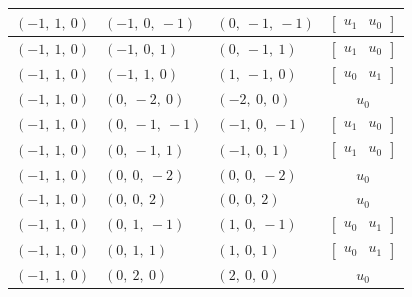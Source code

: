 \documentclass[11pt]{article}
\theoremstyle{definition}
\begin{document}
\begin{longtable}{|l|l|l|c|}
    \hline
    $\left( -1, \  1, \  0\right)$ & $\left( -1, \  0, \  -1\right)$ & $\left( 0, \  -1, \  -1\right)$ & $\left[\begin{matrix}u_{1} & u_{0}\end{matrix}\right]$ \\
    \hline
    $\left( -1, \  1, \  0\right)$ & $\left( -1, \  0, \  1\right)$ & $\left( 0, \  -1, \  1\right)$ & $\left[\begin{matrix}u_{1} & u_{0}\end{matrix}\right]$ \\
    \hline
    $\left( -1, \  1, \  0\right)$ & $\left( -1, \  1, \  0\right)$ & $\left( 1, \  -1, \  0\right)$ & $\left[\begin{matrix}u_{0} & u_{1}\end{matrix}\right]$ \\
    \hline
    $\left( -1, \  1, \  0\right)$ & $\left( 0, \  -2, \  0\right)$ & $\left( -2, \  0, \  0\right)$ & $u_{0}$ \\
    \hline
    $\left( -1, \  1, \  0\right)$ & $\left( 0, \  -1, \  -1\right)$ & $\left( -1, \  0, \  -1\right)$ & $\left[\begin{matrix}u_{1} & u_{0}\end{matrix}\right]$ \\
    \hline
    $\left( -1, \  1, \  0\right)$ & $\left( 0, \  -1, \  1\right)$ & $\left( -1, \  0, \  1\right)$ & $\left[\begin{matrix}u_{1} & u_{0}\end{matrix}\right]$ \\
    \hline
    $\left( -1, \  1, \  0\right)$ & $\left( 0, \  0, \  -2\right)$ & $\left( 0, \  0, \  -2\right)$ & $u_{0}$ \\
    \hline
    $\left( -1, \  1, \  0\right)$ & $\left( 0, \  0, \  2\right)$ & $\left( 0, \  0, \  2\right)$ & $u_{0}$ \\
    \hline
    $\left( -1, \  1, \  0\right)$ & $\left( 0, \  1, \  -1\right)$ & $\left( 1, \  0, \  -1\right)$ & $\left[\begin{matrix}u_{0} & u_{1}\end{matrix}\right]$ \\
    \hline
    $\left( -1, \  1, \  0\right)$ & $\left( 0, \  1, \  1\right)$ & $\left( 1, \  0, \  1\right)$ & $\left[\begin{matrix}u_{0} & u_{1}\end{matrix}\right]$ \\
    \hline
    $\left( -1, \  1, \  0\right)$ & $\left( 0, \  2, \  0\right)$ & $\left( 2, \  0, \  0\right)$ & $u_{0}$ \\

\end{longtable}
\end{document}
